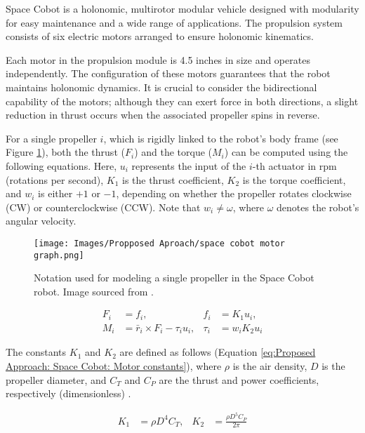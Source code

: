 Space Cobot \cite{roque2016space} is a holonomic, multirotor modular vehicle designed with modularity for easy maintenance and a wide range of applications. The propulsion system consists of six electric motors arranged to ensure holonomic kinematics.

Each motor in the propulsion module is 4.5 inches in size and operates independently. The configuration of these motors guarantees that the robot maintains holonomic dynamics. It is crucial to consider the bidirectional capability of the motors; although they can exert force in both directions, a slight reduction in thrust occurs when the associated propeller spins in reverse.

For a single propeller \(i\), which is rigidly linked to the robot's body frame (see Figure \ref{fig:Proposed Approach: Space Cobot: Motor graph}), both the thrust (\(F_{i}\)) and the torque (\(M_{i}\)) can be computed using the following equations. Here, \(u_i\) represents the input of the \(i\)-th actuator in rpm (rotations per second), \(K_1\) is the thrust coefficient, \(K_2\) is the torque coefficient, and \(w_i\) is either \(+1\) or \(-1\), depending on whether the propeller rotates clockwise (CW) or counterclockwise (CCW). Note that \(w_i \neq \omega\), where \(\omega\) denotes the robot's angular velocity.

\begin{figure}[H]
    \centering
    \texttt{[image: Images/Propposed Aproach/space cobot motor graph.png]}
    \caption{Notation used for modeling a single propeller in the Space Cobot robot. Image sourced from \cite{roque2016space}.}
    \label{fig:Proposed Approach: Space Cobot: Motor graph}
\end{figure}

\begin{align}
    F_{i} &= f_i, & f_i &= K_{1} u_i, \\
    M_{i} &= \bar{r}_{i} \times F_{i} - \tau_{i} u_i, & \tau_{i} &= w_i K_{2} u_i
    \label{eq:Proposed Approach: Space Cobot: Motor equations}
\end{align}

The constants \(K_1\) and \(K_2\) are defined as follows (Equation \ref{eq:Proposed Approach: Space Cobot: Motor constants}), where \(\rho\) is the air density, \(D\) is the propeller diameter, and \(C_T\) and \(C_P\) are the thrust and power coefficients, respectively (dimensionless) \cite{mccormick1994aerodynamics}.

\begin{align}
    K_{1} &= \rho D^{4} C_{T}, & K_{2} &= \frac{\rho D^{5} C_{P}}{2\pi}
    \label{eq:Proposed Approach: Space Cobot: Motor constants}
\end{align}

